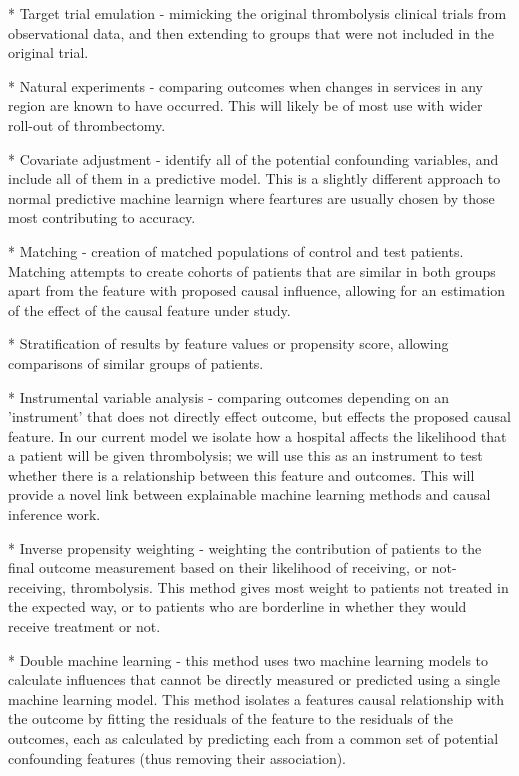 \begin{markdown}
    * Target trial emulation - mimicking the original thrombolysis clinical trials from observational data, and then extending to groups that were not included in the original trial.

    * Natural experiments - comparing outcomes when changes in services in any region are known to have occurred. This will likely be of most use with wider roll-out of thrombectomy.

    * Covariate adjustment - identify all of the potential confounding variables, and include all of them in a predictive model. This is a slightly different approach to normal predictive machine learnign where feartures are usually chosen by those most contributing to accuracy.

    * Matching - creation of matched populations of control and test patients. Matching attempts to create cohorts of patients that are similar in both groups apart from the feature with proposed causal influence, allowing for an estimation of the effect of the causal feature under study. 

    * Stratification of results by feature values or propensity score, allowing comparisons of similar groups of patients.

    * Instrumental variable analysis - comparing outcomes depending on an 'instrument' that does not directly effect outcome, but effects the proposed causal feature. In our current model we isolate how a hospital affects the likelihood that a patient will be given thrombolysis; we will use this as an instrument to test whether there is a relationship between this feature and outcomes. This will provide a novel link between explainable machine learning methods and causal inference work.
           
    * Inverse propensity weighting - weighting the contribution of patients to the final outcome measurement based on their likelihood of receiving, or not-receiving, thrombolysis. This method gives most weight to patients not treated in the expected way, or to patients who are borderline in whether they would receive treatment or not.   
       
    * Double machine learning - this method uses two machine learning models to calculate influences that cannot be directly measured or predicted using a single machine learning model. This method isolates a features causal relationship with the outcome by fitting the residuals of the feature to the residuals of the outcomes, each as calculated by predicting each from a common set of potential confounding features (thus removing their association).


\end{markdown}
